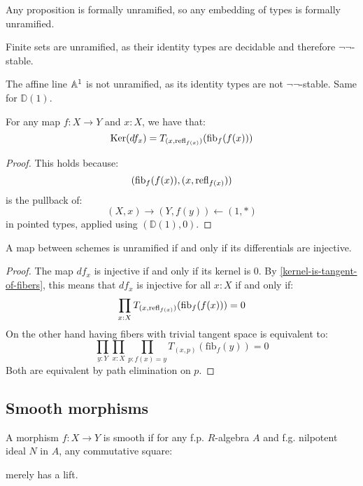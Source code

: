\begin{example}
Any proposition is formally unramified, so any embedding of types is formally unramified.

Finite sets are unramified, as their identity types are decidable and therefore $\neg\neg$-stable.

The affine line $\mathbb{A}^1$ is not unramified, as its identity types are not $\neg\neg$-stable. Same for $\mathbb{D}(1)$.
\end{example}

\begin{lemma}
\label{kernel-is-tangent-of-fibers}
For any map $f:X\to Y$ and $x:X$, we have that:
\[
\mathrm{Ker}(df_x) = T_{(x,\mathrm{refl}_{f(x)})}(\mathrm{fib}_f(f(x)))
\]
\end{lemma}
\begin{proof}
This holds because:
\[
(\mathrm{fib}_f(f(x)),(x,\mathrm{refl}_{f(x)}))
\]
is the pullback of:
\[
(X,x) \to (Y,f(y)) \leftarrow (1,*)
\]
in pointed types, applied using $(\mathbb{D}(1),0)$.
\end{proof}

\begin{proposition}
A map between schemes is unramified if and only if its differentials are injective. 
\end{proposition}
\begin{proof}
The map $df_x$ is injective if and only if its kernel is $0$. By \cref{kernel-is-tangent-of-fibers}, this means that $df_x$ is injective for all $x:X$ if and only if:
\[
\prod_{x:X}T_{(x,\mathrm{refl}_{f(x)})}(\mathrm{fib}_f(f(x)))=0
\]
On the other hand having fibers with trivial tangent space is equivalent to:
\[
\prod_{y:Y}\prod_{x:X}\prod_{p:f(x)=y} T_{(x,p)}(\mathrm{fib}_f(y)) = 0
\]
Both are equivalent by path elimination on $p$.
\end{proof}

\subsection{Smooth morphisms}

\begin{definition}
A morphism $f:X\to Y$ is smooth if for any f.p. $R$-algebra $A$ and f.g. nilpotent ideal $N$ in $A$, any commutative square:
 \begin{center}
    \end{center}
merely has a lift.
\end{definition}

